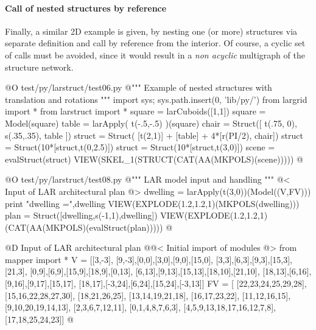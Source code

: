 \documentclass[11pt,oneside]{article}    %
\begin{document}
\paragraph{Call of nested structures by reference}
Finally, a similar 2D example is given, by nesting one (or more) structures via separate definition and call by reference from the interior. Of course, a cyclic set of calls must be avoided, since it would result in a \emph{non acyclic} multigraph of the structure network.

@O test/py/larstruct/test06.py
@{""" Example of nested structures with translation and rotations """
import sys; sys.path.insert(0, 'lib/py/')
from largrid import *
from larstruct import *
square = larCuboids([1,1])
square = Model(square)
table = larApply( t(-.5,-.5) )(square)
chair = Struct([ t(.75, 0), s(.35,.35), table ])
struct = Struct( [t(2,1)] + [table] + 4*[r(PI/2), chair])
struct = Struct(10*[struct,t(0,2.5)])
struct = Struct(10*[struct,t(3,0)])
scene = evalStruct(struct)
VIEW(SKEL_1(STRUCT(CAT(AA(MKPOLS)(scene)))))
@}


@O test/py/larstruct/test08.py
@{""" LAR model input and handling """
@< Input of LAR architectural plan @>
dwelling = larApply(t(3,0))(Model((V,FV)))
print "\n dwelling =",dwelling
VIEW(EXPLODE(1.2,1.2,1)(MKPOLS(dwelling)))
plan = Struct([dwelling,s(-1,1),dwelling])
VIEW(EXPLODE(1.2,1.2,1)(CAT(AA(MKPOLS)(evalStruct(plan)))))
@}



@D Input of LAR architectural plan
@{@< Initial import of modules @>
from mapper import *
V = [[3,-3],
[9,-3],[0,0],[3,0],[9,0],[15,0],
[3,3],[6,3],[9,3],[15,3],[21,3], 
[0,9],[6,9],[15,9],[18,9],[0,13],
[6,13],[9,13],[15,13],[18,10],[21,10], 
[18,13],[6,16],[9,16],[9,17],[15,17],
[18,17],[-3,24],[6,24],[15,24],[-3,13]]
FV = [
[22,23,24,25,29,28], [15,16,22,28,27,30], [18,21,26,25], 
[13,14,19,21,18], [16,17,23,22], [11,12,16,15],
[9,10,20,19,14,13], [2,3,6,7,12,11], [0,1,4,8,7,6,3],
[4,5,9,13,18,17,16,12,7,8],[17,18,25,24,23]]
@}
\end{document}
